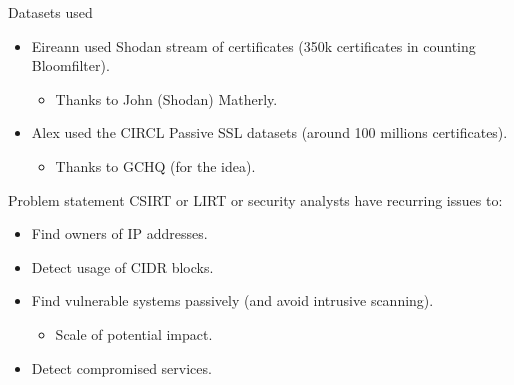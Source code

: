 
\begin{frame}[t,plain]
\titlepage
\end{frame}




\begin{frame}[t, fragile]{Datasets used}
\begin{itemize}
        \item Eireann used Shodan stream of certificates (350k certificates in counting Bloomfilter).
                \begin{itemize}
                        \item Thanks to John (Shodan) Matherly.
                \end{itemize}
        \item Alex used the CIRCL Passive SSL datasets (around 100 millions certificates).
                \begin{itemize}
                        \item Thanks to GCHQ (for the idea).
                \end{itemize}
\end{itemize}
\end{frame}

\begin{frame}[t,fragile]{Problem statement}
        CSIRT or LIRT or security analysts have recurring issues to:
\begin{itemize}
        \item Find owners of IP addresses.
        \item Detect usage of CIDR blocks.
        \item Find vulnerable systems passively (and avoid intrusive scanning).
        \begin{itemize}
                \item Scale of potential impact.
        \end{itemize}
        \item Detect compromised services.
\end{itemize}
\end{frame}

